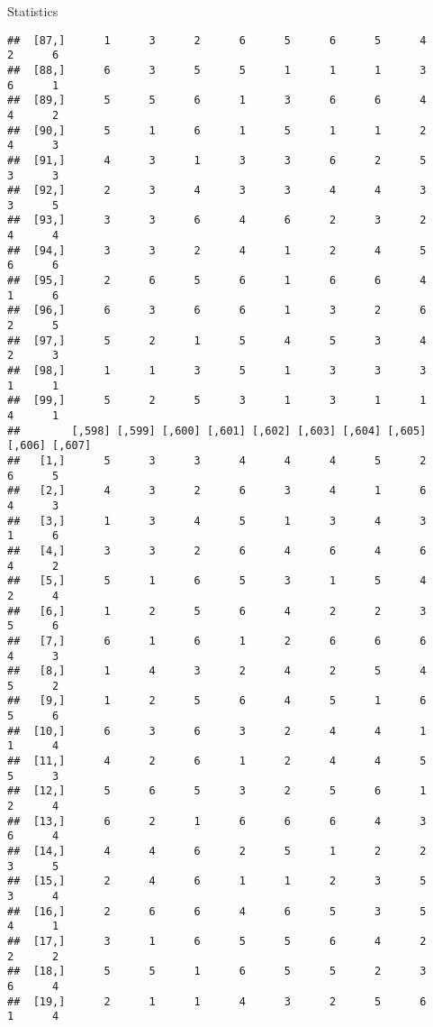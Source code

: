 \documentclass[
  ignorenonframetext,
]{beamer}
\begin{document}
\begin{frame}[fragile]{Statistics}
\begin{verbatim}
##  [87,]      1      3      2      6      5      6      5      4      2      6
##  [88,]      6      3      5      5      1      1      1      3      6      1
##  [89,]      5      5      6      1      3      6      6      4      4      2
##  [90,]      5      1      6      1      5      1      1      2      4      3
##  [91,]      4      3      1      3      3      6      2      5      3      3
##  [92,]      2      3      4      3      3      4      4      3      3      5
##  [93,]      3      3      6      4      6      2      3      2      4      4
##  [94,]      3      3      2      4      1      2      4      5      6      6
##  [95,]      2      6      5      6      1      6      6      4      1      6
##  [96,]      6      3      6      6      1      3      2      6      2      5
##  [97,]      5      2      1      5      4      5      3      4      2      3
##  [98,]      1      1      3      5      1      3      3      3      1      1
##  [99,]      5      2      5      3      1      3      1      1      4      1
##        [,598] [,599] [,600] [,601] [,602] [,603] [,604] [,605] [,606] [,607]
##   [1,]      5      3      3      4      4      4      5      2      6      5
##   [2,]      4      3      2      6      3      4      1      6      4      3
##   [3,]      1      3      4      5      1      3      4      3      1      6
##   [4,]      3      3      2      6      4      6      4      6      4      2
##   [5,]      5      1      6      5      3      1      5      4      2      4
##   [6,]      1      2      5      6      4      2      2      3      5      6
##   [7,]      6      1      6      1      2      6      6      6      4      3
##   [8,]      1      4      3      2      4      2      5      4      5      2
##   [9,]      1      2      5      6      4      5      1      6      5      6
##  [10,]      6      3      6      3      2      4      4      1      1      4
##  [11,]      4      2      6      1      2      4      4      5      5      3
##  [12,]      5      6      5      3      2      5      6      1      2      4
##  [13,]      6      2      1      6      6      6      4      3      6      4
##  [14,]      4      4      6      2      5      1      2      2      3      5
##  [15,]      2      4      6      1      1      2      3      5      3      4
##  [16,]      2      6      6      4      6      5      3      5      4      1
##  [17,]      3      1      6      5      5      6      4      2      2      2
##  [18,]      5      5      1      6      5      5      2      3      6      4
##  [19,]      2      1      1      4      3      2      5      6      1      4

\end{verbatim}
\end{frame}
\end{document}
